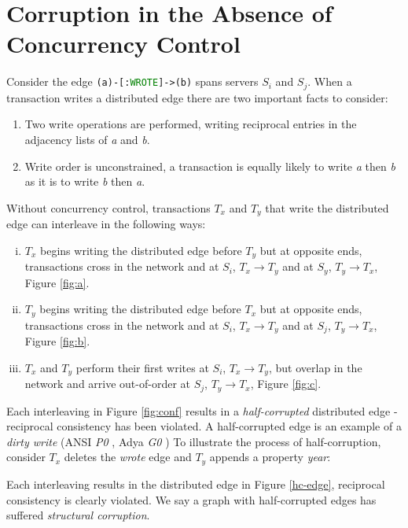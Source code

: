 \section{Corruption in the Absence of Concurrency Control}
\label{sec:db-corruption}

Consider the edge \texttt{(a)-[:\textcolor{green}{WROTE}]->(b)} spans servers $S_i$ and $S_j$.
When a transaction writes a distributed edge there are two important facts to consider:
\begin{enumerate}
\item Two write operations are performed, writing reciprocal entries in the adjacency lists of \emph{a} and \emph{b}.
\item Write order is unconstrained, a transaction is equally likely to write \emph{a} then \emph{b} as it is to write \emph{b} then \emph{a}.
\end{enumerate}

Without concurrency control, transactions $T_x$ and $T_y$ that write the distributed edge can interleave in the following ways:
\begin{enumerate}[(i)]
\item $T_x$ begins writing the distributed edge before $T_y$ but at opposite ends, transactions cross in the network and at $S_i$, $T_x \rightarrow T_y$ and at $S_y$, $T_y \rightarrow T_x$, Figure \ref{fig:a}.
\item $T_y$ begins writing the distributed edge before $T_x$ but at opposite ends, transactions cross in the network and at $S_i$, $T_x \rightarrow T_y$ and at $S_j$, $T_y \rightarrow T_x$, Figure \ref{fig:b}.
\item $T_x$ and $T_y$ perform their first writes at $S_i$, $T_x \rightarrow T_y$, but overlap in the network and arrive out-of-order at $S_j$, $T_y \rightarrow T_x$, Figure \ref{fig:c}.
\end{enumerate}

Each interleaving in Figure \ref{fig:conf} results in a \emph{half-corrupted} distributed edge - reciprocal consistency has been violated.
A half-corrupted edge is an example of a \emph{dirty write} (ANSI \emph{P0} \cite{Berenson1995}, Adya \emph{G0} \cite{Adya2000})
To illustrate the process of half-corruption, consider $T_x$ deletes the \emph{wrote} edge and $T_y$ appends a property \emph{year}:


Each interleaving results in the distributed edge in Figure \ref{hc-edge}, reciprocal consistency is clearly violated.
We say a graph with half-corrupted edges has suffered \emph{structural corruption}.

